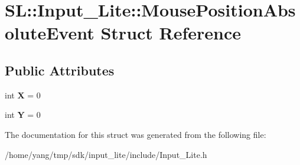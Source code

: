 \hypertarget{struct_s_l_1_1_input___lite_1_1_mouse_position_absolute_event}{}\section{SL\+:\+:Input\+\_\+\+Lite\+:\+:Mouse\+Position\+Absolute\+Event Struct Reference}
\label{struct_s_l_1_1_input___lite_1_1_mouse_position_absolute_event}
\subsection*{Public Attributes}
\begin{DoxyCompactItemize}
\item 
int {\bfseries X} = 0\hypertarget{struct_s_l_1_1_input___lite_1_1_mouse_position_absolute_event_a2e311cf50ebd2ed28df5a9e6106afa73}{}\label{struct_s_l_1_1_input___lite_1_1_mouse_position_absolute_event_a2e311cf50ebd2ed28df5a9e6106afa73}

\item 
int {\bfseries Y} = 0\hypertarget{struct_s_l_1_1_input___lite_1_1_mouse_position_absolute_event_a136a0e570fa85f724e3d6bb2cbc1c8fe}{}\label{struct_s_l_1_1_input___lite_1_1_mouse_position_absolute_event_a136a0e570fa85f724e3d6bb2cbc1c8fe}

\end{DoxyCompactItemize}


The documentation for this struct was generated from the following file\+:\begin{DoxyCompactItemize}
\item 
/home/yang/tmp/sdk/input\+\_\+lite/include/Input\+\_\+\+Lite.\+h\end{DoxyCompactItemize}
